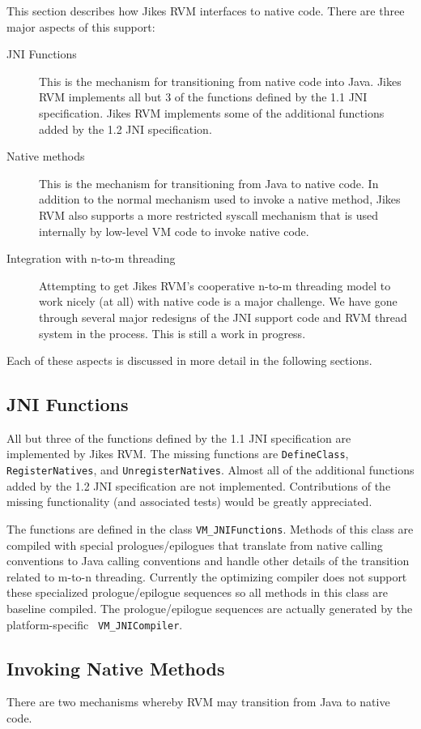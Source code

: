 
This section describes how Jikes RVM interfaces to native code. There
are three major aspects of this support:
\begin{description}
\item [JNI Functions] This is the mechanism for transitioning from
native code into Java. Jikes RVM implements all but 3 of the
functions defined by the 1.1 JNI specification. Jikes RVM implements
some of the additional functions added by the 1.2 JNI
specification.
\item [Native methods] This is the mechanism for transitioning from
Java to native code. In addition to the normal mechanism used to
invoke a native method, Jikes RVM also supports a more restricted
syscall mechanism that is used internally by low-level VM code to
invoke native code. 
\item [Integration with n-to-m threading] Attempting to get Jikes RVM's
cooperative n-to-m threading model to work nicely (at all) with native
code is a major challenge. We have gone through several major
redesigns of the JNI support code and RVM thread system in the
process. This is still a work in progress.
\end{description}
Each of these aspects is discussed in more detail in the following
sections. 

\subsection{JNI Functions}
All but three of the functions defined by the 1.1 JNI specification are
implemented by Jikes RVM. The missing functions are {\tt DefineClass},
{\tt RegisterNatives}, and {\tt UnregisterNatives}.  Almost all of the
additional functions added by the 1.2 JNI specification are not
implemented.  Contributions of the missing functionality (and
associated tests) would be greatly appreciated. 

The functions are defined in the class {\tt VM\_JNIFunctions}. Methods
of this class are compiled with special prologues/epilogues that
translate from native calling conventions to Java calling conventions
and handle other details of the transition related to m-to-n
threading.  Currently the optimizing compiler 
does not support these specialized prologue/epilogue sequences so all
methods in this class are baseline compiled.  The prologue/epilogue
sequences are actually generated by the platform-specific {\tt
VM\_JNICompiler}. 

\subsection{Invoking Native Methods}
There are two mechanisms whereby RVM may transition from Java to native
code.

